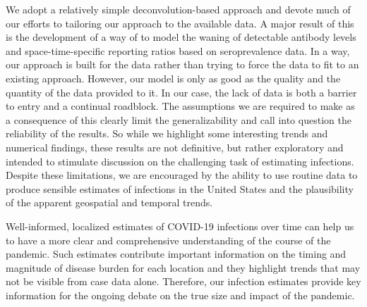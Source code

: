 We adopt a relatively simple deconvolution-based approach and devote
much of our efforts to tailoring our approach to the available data. A major
result of this is the development of a way of to model the waning of detectable
antibody levels and space-time-specific reporting ratios based on seroprevalence
data. In a way, our approach is built for the data rather than trying to force
the data to fit to an existing approach. However, our model is only as good as
the quality and the quantity of the data provided to it. In our case, the lack
of data is both a barrier to entry and a continual roadblock. The assumptions we
are required to make as a consequence of this clearly limit the generalizability
and call into question the reliability of the results. So while we highlight
some interesting trends and numerical findings, these results are not
definitive, but rather exploratory and intended to stimulate discussion on the
challenging task of estimating infections. Despite these limitations, we are
encouraged by the ability to use routine data to produce sensible estimates of
infections in the United States and the plausibility of the apparent geospatial
and temporal trends. 
 




Well-informed, localized estimates of COVID-19 infections over time can help us
to have a more clear and comprehensive understanding of the course of the
pandemic. Such estimates contribute important information on the timing and
magnitude of disease burden for each location and they highlight trends that may
not be visible from case data alone. Therefore, our infection estimates provide
key information for the ongoing debate on the true size and impact of the
pandemic.
